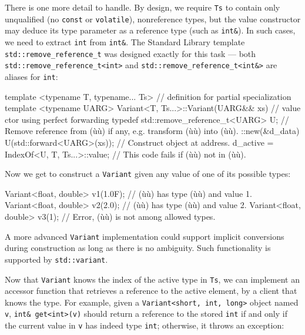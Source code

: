 There is one more detail to handle. By design, we require \lstinline!Ts! to
contain only unqualified (no \lstinline!const! or \lstinline!volatile!),
nonreference types, but the value constructor may deduce its type
parameter as a reference type (such as \lstinline!int&!). In such cases,
we need to extract \lstinline!int! from \lstinline!int&!. The Standard
Library template \lstinline!std::remove_reference_t! was designed exactly
for this task --- both \lstinline!std::remove_reference_t<int>! and
\lstinline!std::remove_reference_t<int&>! are aliases for \lstinline!int!:

\begin{emcppslisting}[emcppsbatch={e38,e39}]
template <typename T, typename... Ts>  // definition for partial specialization
template <typename UARG>              
Variant<T, Ts...>::Variant(UARG&& xs)  // value ctor using perfect forwarding 
{
    typedef std::remove_reference_t<UARG> U;
        // Remove reference from (ù{}ù) if any, e.g. transform (ù{}ù) into (ù{}ù).
    ::new(&d_data) U(std::forward<UARG>(xs));  // Construct object at address.
    d_active = IndexOf<U, T, Ts...>::value;    // This code fails if (ù{}ù) not in (ù{}ù).
}
\end{emcppslisting}
    

\noindent Now we get to construct a \lstinline!Variant! given any value of one of its
possible types:

\begin{emcppslisting}[emcppsbatch={e38,e39}]
Variant<float, double> v1(1.0F);  // (ù{}ù) has type (ù{}ù) and value 1.
Variant<float, double> v2(2.0);   // (ù{}ù) has type (ù{}ù) and value 2.
Variant<float, double> v3(1);     // Error, (ù{}ù) is not among allowed types.
\end{emcppslisting}
    

\noindent A more advanced \lstinline!Variant! implementation could support implicit
conversions during construction as long as there is no ambiguity. Such
functionality is supported by \lstinline!std::variant!.

Now that \lstinline!Variant! knows the index of the active type in
\lstinline!Ts!, we can implement an accessor function that retrieves a
reference to the active element, by a client that knows the type. For
example, given a \lstinline!Variant<short,!~\lstinline!int,!~\lstinline!long>!
object named \lstinline!v!, \lstinline!int&!~\lstinline!get<int>(v)! should
return a reference to the stored \lstinline!int! if and only if the current
value in \lstinline!v! has indeed type \lstinline!int!; otherwise, it throws
an exception:

